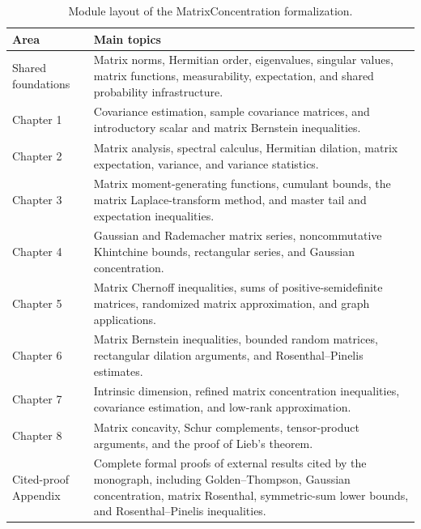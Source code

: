 %

\begin{table}[htbp]
\centering
\small
\caption{Module layout of the MatrixConcentration formalization.}
\label{tab:matrix-concentration-module-layout}
\begin{tabularx}{\textwidth}{
  @{}>{\raggedright\arraybackslash}p{}
  >{\raggedright\arraybackslash}X@{}}
\toprule
Area & Main topics \\
\midrule
Shared foundations &
Matrix norms, Hermitian order, eigenvalues, singular values, matrix functions, measurability, expectation, and shared probability infrastructure. \\

Chapter 1 &
Covariance estimation, sample covariance matrices, and introductory scalar and matrix Bernstein inequalities. \\

Chapter 2 &
Matrix analysis, spectral calculus, Hermitian dilation, matrix expectation, variance, and variance statistics. \\

Chapter 3 &
Matrix moment-generating functions, cumulant bounds, the matrix Laplace-transform method, and master tail and expectation inequalities. \\

Chapter 4 &
Gaussian and Rademacher matrix series, noncommutative Khintchine bounds, rectangular series, and Gaussian concentration. \\

Chapter 5 &
Matrix Chernoff inequalities, sums of positive-semidefinite matrices, randomized matrix approximation, and graph applications. \\

Chapter 6 &
Matrix Bernstein inequalities, bounded random matrices, rectangular dilation arguments, and Rosenthal--Pinelis estimates. \\

Chapter 7 &
Intrinsic dimension, refined matrix concentration inequalities, covariance estimation, and low-rank approximation. \\

Chapter 8 &
Matrix concavity, Schur complements, tensor-product arguments, and the proof of Lieb's theorem. \\

Cited-proof Appendix &
Complete formal proofs of external results cited by the monograph, including Golden--Thompson, Gaussian concentration, matrix Rosenthal, symmetric-sum lower bounds, and Rosenthal--Pinelis inequalities. \\
\bottomrule
\end{tabularx}
\end{table}


